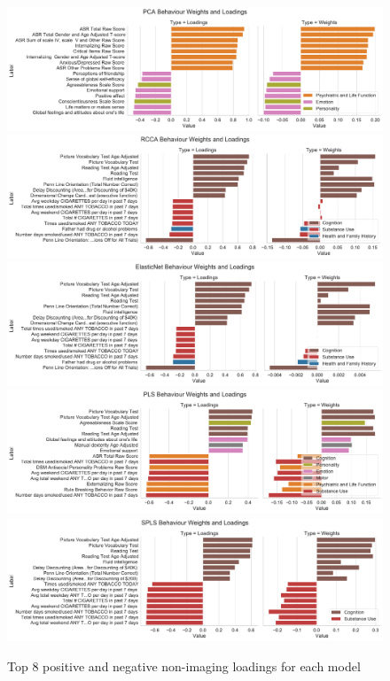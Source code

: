 \begin{figure}
\centering
\includegraphics[width=0.8\linewidth]{figures/regularization/hcp/PCA behaviour weights and loadings.pdf}
\includegraphics[width=0.8\linewidth]{figures/regularization/hcp/RCCA behaviour weights and loadings.pdf}
\includegraphics[width=0.8\linewidth]{figures/regularization/hcp/ElasticNet behaviour weights and loadings.pdf}
\includegraphics[width=0.8\linewidth]{figures/regularization/hcp/PLS behaviour weights and loadings.pdf}
\includegraphics[width=0.8\linewidth]{figures/regularization/hcp/SPLS behaviour weights and loadings.pdf}
\caption{Top 8 positive and negative non-imaging loadings for each model}\label{fig:behaviour}
\end{figure}

